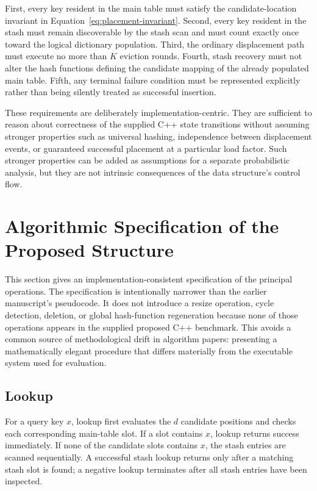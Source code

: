 \documentclass[conference]{IEEEtran}
\begin{document}
First, every key resident in the main table must satisfy the candidate-location invariant in Equation~\eqref{eq:placement-invariant}. Second, every key resident in the stash must remain discoverable by the stash scan and must count exactly once toward the logical dictionary population. Third, the ordinary displacement path must execute no more than $K$ eviction rounds. Fourth, stash recovery must not alter the hash functions defining the candidate mapping of the already populated main table. Fifth, any terminal failure condition must be represented explicitly rather than being silently treated as successful insertion.

These requirements are deliberately implementation-centric. They are sufficient to reason about correctness of the supplied C++ state transitions without assuming stronger properties such as universal hashing, independence between displacement events, or guaranteed successful placement at a particular load factor. Such stronger properties can be added as assumptions for a separate probabilistic analysis, but they are not intrinsic consequences of the data structure's control flow.

\section{Algorithmic Specification of the Proposed Structure}

This section gives an implementation-consistent specification of the principal operations. The specification is intentionally narrower than the earlier manuscript's pseudocode. It does not introduce a resize operation, cycle detection, deletion, or global hash-function regeneration because none of those operations appears in the supplied proposed C++ benchmark. This avoids a common source of methodological drift in algorithm papers: presenting a mathematically elegant procedure that differs materially from the executable system used for evaluation.

\subsection{Lookup}

For a query key $x$, lookup first evaluates the $d$ candidate positions and checks each corresponding main-table slot. If a slot contains $x$, lookup returns success immediately. If none of the candidate slots contains $x$, the stash entries are scanned sequentially. A successful stash lookup returns only after a matching stash slot is found; a negative lookup terminates after all stash entries have been inspected.
\end{document}
